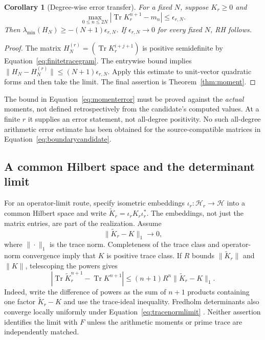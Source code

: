 \documentclass[11pt,letterpaper]{article}
\numberwithin{equation}{section}
\newtheorem{corollary}[theorem]{Corollary}
\theoremstyle{definition}
\theoremstyle{remark}
\newcommand{\HS}{\mathcal H}
\DeclareMathOperator{\Tr}{Tr}
\begin{document}
\begin{corollary}[Degree-wise error transfer]
\label{cor:degreeerror}
For a fixed $N$, suppose $K_r\geq0$ and
\begin{equation}
 \max_{0\leq n\leq2N}\left|\Tr K_r^{n+1}-m_n\right|
 \leq\epsilon_{r,N}.
 \label{eq:momenterror}
\end{equation}
Then $\lambda_{\min}(H_N)\geq-(N+1)\epsilon_{r,N}$. If $\epsilon_{r,N}\to0$ for every fixed $N$, RH follows.
\end{corollary}
\begin{proof}
The matrix $H_N^{(r)}=(\Tr K_r^{i+j+1})$ is positive semidefinite by Equation~\eqref{eq:finitetracegram}. The entrywise bound implies
$\|H_N-H_N^{(r)}\|\leq(N+1)\epsilon_{r,N}$. Apply this estimate to unit-vector quadratic forms and then take the limit. The final assertion is Theorem~\ref{thm:moment}.
\end{proof}

The bound in Equation~\eqref{eq:momenterror} must be proved against the \emph{actual} moments, not defined retrospectively from the candidate's computed values. At a finite $r$ it supplies an error statement, not all-degree positivity. No such all-degree arithmetic error estimate has been obtained for the source-compatible matrices in Equation~\eqref{eq:boundarycandidate}.

\subsection{A common Hilbert space and the determinant limit}
\label{subsec:tracenormlimit}
For an operator-limit route, specify isometric embeddings $\iota_r:\HS_r\to\HS$ into a common Hilbert space and write $\widetilde K_r=\iota_rK_r\iota_r^{*}$. The embeddings, not just the matrix entries, are part of the realization. Assume
\begin{equation}
 \|\widetilde K_r-K\|_1\longrightarrow0,
 \label{eq:tracenormlimit}
\end{equation}
where $\|\cdot\|_1$ is the trace norm. Completeness of the trace class and operator-norm convergence imply that $K$ is positive trace class. If $R$ bounds $\|\widetilde K_r\|$ and $\|K\|$, telescoping the powers gives
\begin{equation}
 \left|\Tr\widetilde K_r^{n+1}-\Tr K^{n+1}\right|
 \leq(n+1)R^n\|\widetilde K_r-K\|_1.
 \label{eq:powertraceerror}
\end{equation}
Indeed, write the difference of powers as the sum of $n+1$ products containing one factor $\widetilde K_r-K$ and use the trace-ideal inequality. Fredholm determinants also converge locally uniformly under Equation~\eqref{eq:tracenormlimit} \cite{simon,bornemann}. Neither assertion identifies the limit with $F$ unless the arithmetic moments or prime trace are independently matched.
\end{document}

